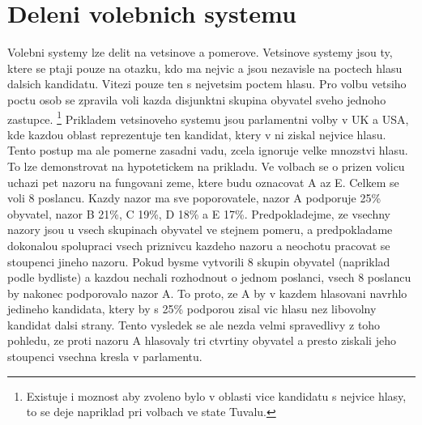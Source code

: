 \documentclass[12pt,a4paper]{report}
\begin{document}
\section{Deleni volebnich systemu}
Volebni systemy lze delit na vetsinove a pomerove. Vetsinove systemy jsou ty, ktere se ptaji pouze na otazku, kdo ma nejvic a jsou nezavisle na poctech hlasu dalsich kandidatu.
Vitezi pouze ten s nejvetsim poctem hlasu.
Pro volbu vetsiho poctu osob se zpravila voli kazda disjunktni skupina obyvatel sveho jednoho zastupce.
\footnote{Existuje i moznost aby zvoleno bylo v oblasti vice kandidatu s nejvice hlasy, to se deje napriklad pri volbach ve state Tuvalu.\autocite{TUV}}
Prikladem vetsinoveho systemu jsou parlamentni volby v UK a USA, kde kazdou oblast reprezentuje ten kandidat, ktery v ni ziskal nejvice hlasu.
Tento postup ma ale pomerne zasadni vadu, zcela ignoruje velke mnozstvi hlasu.
To lze demonstrovat na hypotetickem na prikladu. Ve volbach se o prizen volicu uchazi pet nazoru na fungovani zeme, ktere budu oznacovat A az E.
Celkem se voli 8 poslancu.
Kazdy nazor ma sve poporovatele, nazor A podporuje 25\% obyvatel, nazor B 21\%, C 19\%, D 18\% a E 17\%.
Predpokladejme, ze vsechny nazory jsou u vsech skupinach obyvatel ve stejnem pomeru, a predpokladame dokonalou spolupraci vsech priznivcu kazdeho nazoru a neochotu pracovat se stoupenci jineho nazoru.
Pokud bysme vytvorili 8 skupin obyvatel (napriklad podle bydliste) a kazdou nechali rozhodnout o jednom poslanci, vsech 8 poslancu by nakonec podporovalo nazor A.
To proto, ze A by v kazdem hlasovani navrhlo jedineho kandidata, ktery by s 25\% podporou zisal vic hlasu nez libovolny kandidat dalsi strany. 
Tento vysledek se ale nezda velmi spravedlivy z toho pohledu, ze proti nazoru A hlasovaly tri ctvrtiny obyvatel a presto ziskali jeho stoupenci vsechna kresla v parlamentu.
\end{document}
